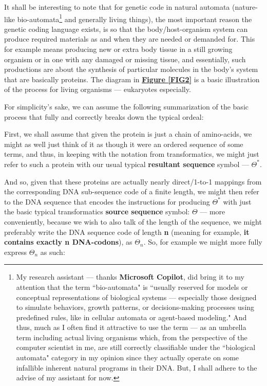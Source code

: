 \documentclass[a4paper, 18pt]{book} %
\begin{document}
It shall be interesting to note that for genetic code in natural automata (nature-like bio-automata\footnote{My research assistant --- thanks \textbf{Microsoft Copilot}, did bring it to my attention that the term ``bio-automata" is ``usually reserved for models or conceptual representations of biological systems --- especially those designed to simulate behaviors, growth patterns, or decisions-making processes using predefined rules, like in cellular automata or agent-based modeling." And thus, much as I often find it attractive to use the term --- as an umbrella term including actual living organisms which, from the perspective of the computer scientist in me, are still correctly classifiable under the ``biological automata" category in my opinion since they actually operate on some infallible inherent natural programs in their DNA. But, I shall adhere to the advise of my assistant for now.} and generally living things), the most important reason the genetic coding language exists, is so that the body/host-organism system can produce required materials as and when they are needed or demanded for. This for example means producing new or extra body tissue in a still growing organism or in one with any damaged or missing tissue, and essentially, such productions are about the synthesis of particular molecules in the body's system that are basically proteins. The diagram in \textbf{\hyperref[FIG2]{Figure \ref{FIG2}}} is a basic illustration of the process for living organisms --- eukaryotes especially.

For simplicity's sake, we can assume the following summarization of the basic process that fully and correctly breaks down the typical ordeal:

First, we shall assume that given the protein is just a chain of amino-acids, we might as well just think of it as though it were an ordered sequence of some terms, and thus, in keeping with the notation from transformatics, we might just refer to such a protein with our usual typical \textbf{resultant sequence} symbol --- $\Theta^*$.

And so, given that these proteins are actually nearly direct/1-to-1 mappings from the corresponding DNA sub-sequence code of a finite length, we might then refer to the DNA sequence that encodes the instructions for producing $\Theta^*$ with just the basic typical transformatics \textbf{source sequence} symbol: $\Theta$ --- more conveniently, because we wish to also talk of the length of the sequence, we might preferably write the DNA sequence code of length \textbf{n} (meaning for example, \textbf{it contains exactly n DNA-codons}), as $\Theta_n$. So, for example we might more fully express $\Theta_n$ as such:
\end{document}
